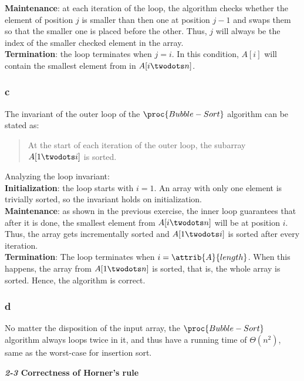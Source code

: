 \documentclass[8pt,a4paper]{article}
\begin{document}
\textbf{Maintenance}: at each iteration of the loop, the algorithm checks whether the
element of position $j$ is smaller than then one at position $j - 1$ and swaps them
so that the smaller one is placed before the other. Thus, $j$ will always be the index
of the smaller checked element in the array. \\

\textbf{Termination}: the loop terminates when $j = i$. In this condition, $A[i]$ will
contain the smallest element from in $A[i \twodots n]$.

\subsubsection*{c}

The invariant of the outer loop of the $\proc{Bubble-Sort}$ algorithm can be stated as:

\begin{quotation}
  At the start of each iteration of the outer \For loop, the subarray $A[1 \twodots i]$
  is sorted.
\end{quotation}

Analyzing the loop invariant: \\

\textbf{Initialization}: the loop starts with $i = 1$. An array with only one element
is trivially sorted, so the invariant holds on initialization. \\

\textbf{Maintenance}: as shown in the previous exercise, the inner loop guarantees
that after it is done, the smallest element from $A[i \twodots n]$ will be at position
$i$. Thus, the array gets incrementally sorted and $A[1 \twodots i]$ is sorted after
every iteration. \\

\textbf{Termination}: The loop terminates when $i = \attrib{A}{length}$. When this
happens, the array from $A[1 \twodots n]$ is sorted, that is, the whole array is
sorted. Hence, the algorithm is correct.

\subsubsection*{d}

No matter the disposition of the input array, the $\proc{Bubble-Sort}$ algorithm
always loops twice in it, and thus have a running time of $\Theta(n^{2})$, same
as the worst-case for insertion sort.

\begin{framed}
  \textbf{\textit{2-3} Correctness of Horner's rule}
\end{framed}
\end{document}
